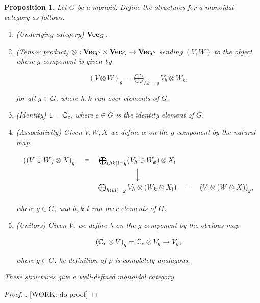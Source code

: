 \documentclass{article}
\newtheorem{proposition}{Proposition}[section]
\theoremstyle{definition}
\numberwithin{figure}{section}
\begin{document}
\begin{proposition} Let $G$ be a monoid. Define the structures for a monoidal category as follows:

\begin{enumerate}
\item (Underlying category) $\bold{Vec}_G$.

\item (Tensor product) $\otimes: \bold{Vec}_G\times \bold{Vec}_G \to \bold{Vec}_G$ sending $(V,W)$ to the object whose $g$-component is given by

$$\left(V\otimes W\right)_g=\bigoplus_{hk=g}V_h\otimes W_k,$$

for all $g\in G$, where $h,k$ run over elements of $G$.

\item (Identity) $1=\mathbb{C}_e$, where $e\in G$ is the identity element of $G$.

\item (Associativity) Given $V,W,X$ we define $\alpha$ on the $g$-component by the natural map

\[\begin{tikzcd}
	{\left(\left(V\otimes W\right)\otimes X\right)_g} & {\bigoplus_{(hk)l=g} (V_h\otimes W_k)\otimes X_l} \\
	& {\bigoplus_{h(kl)=g}V_h\otimes\left(W_k\otimes X_l\right)} & {\left(V\otimes \left(W\otimes X\right)\right)_g},
	\arrow["{=}"{description}, draw=none, from=1-1, to=1-2]
	\arrow["", from=1-2, to=2-2]
	\arrow["{=}"{description}, draw=none, from=2-2, to=2-3]
\end{tikzcd}\]

where $g\in G$, and $h,k,l$ run over elements of $G$. 
\item (Unitors) Given $V$, we define $\lambda$ on the $g$-component by the obvious map

$$\left(\mathbb{C}_e\otimes V\right)_g = \mathbb{C}_e\otimes V_g \xrightarrow{} V_g,$$

where $g\in G$.  he definition of $\rho$ is completely analagous.
\end{enumerate}

These structures give a well-defined monoidal category.
\end{proposition}
\begin{proof}. [WORK: do proof]
\end{proof}
\end{document}
